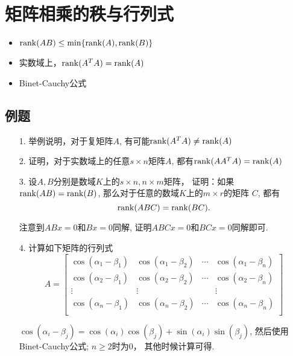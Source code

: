 \section{矩阵相乘的秩与行列式}
\begin{itemize}
\item $\mathrm{rank}(AB) \le \min\{\mathrm{rank}(A), \mathrm{rank}(B)\}$
\item 实数域上，$\mathrm{rank}(A^TA) = \mathrm{rank}(A)$
\item Binet-Cauchy公式
\end{itemize}

\subsection*{例题}
\begin{itemize}
	\item[1.] 举例说明，对于复矩阵$A$, 有可能$\mathrm{rank}(A^TA) \ne \mathrm{rank}(A)$
	\vspace{2cm}

	\item[2.] 证明，对于实数域上的任意$s\times n$矩阵$A$, 都有$\mathrm{rank}(AA^TA) = \mathrm{rank}(A)$
	\vspace{1.5cm}

	\item[3.] 设$A,B$分别是数域$K$上的$s\times n, n\times m$矩阵，
	证明：如果$\mathrm{rank}(AB) = \mathrm{rank}(B)$, 那么对于任意的数域$K$上的$m\times r$的矩阵
	$C$, 都有 
	$$\mathrm{rank}(ABC) = \mathrm{rank}(BC).$$
	\begin{solution}
	注意到$ABx=0$和$Bx=0$同解, 证明$ABCx=0$和$BCx=0$同解即可.
	\end{solution}
	\vspace{2cm}

	\item[4.] 计算如下矩阵的行列式
	\begin{equation}
	\nonumber
	A = \begin{bmatrix}
		\cos(\alpha_1 - \beta_1)& \cos(\alpha_1 - \beta_2)& \cdots& \cos(\alpha_1-\beta_n)\\
		\cos(\alpha_2 - \beta_1)& \cos(\alpha_2 - \beta_2)& \cdots& \cos(\alpha_2-\beta_n)\\
		\vdots& \vdots& & \vdots\\
		\cos(\alpha_n - \beta_1)& \cos(\alpha_n - \beta_2)& \cdots& \cos(\alpha_n-\beta_n)\\
	\end{bmatrix}
	\end{equation}
	\begin{solution}
	$\cos(\alpha_i - \beta_j) = \cos(\alpha_i)\cos(\beta_j) + \sin(\alpha_i)\sin(\beta_j)$,
	然后使用Binet-Cauchy公式; $n\ge 2$时为0， 其他时候计算可得.
	\end{solution}
	\vspace{2cm}

\end{itemize}

